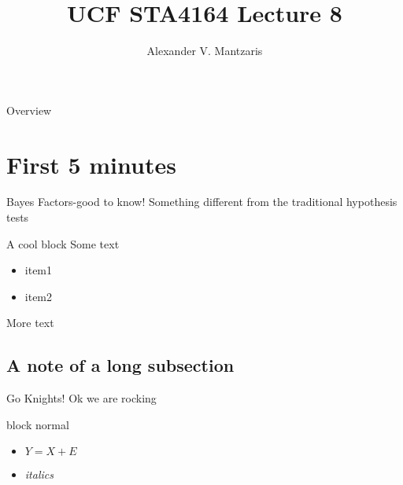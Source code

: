 \documentclass{beamer}
\title[Lect 8]{UCF STA4164 Lecture 8}
\author{Alexander V. Mantzaris}
\date{\vspace{-8cm}}
\begin{document}
\begin{frame}
  \titlepage
\end{frame}

\begin{frame}{Overview}
\tableofcontents
\end{frame}

\section{First 5 minutes}

\begin{frame}{Bayes Factors-good to know!} 
  Something different from the traditional hypothesis tests
  \begin{block}{A cool block}
    Some text
    \begin{itemize}
    \item item1
    \item item2
    \end{itemize}
  \end{block}
  More text
\end{frame}


\subsection{A note of a long subsection}
\begin{frame}{Go Knights!} 
  Ok we are rocking
  \begin{block}{block normal}
    \begin{itemize}
    \item $Y = X + E$
    \item \emph{italics}
    \end{itemize}
  \end{block}
  
\end{frame}
\end{document}
